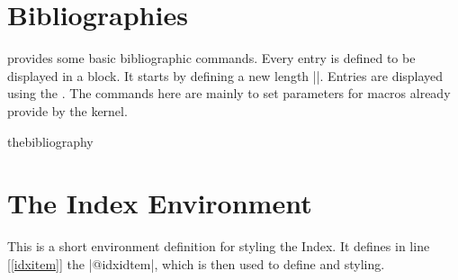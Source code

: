 \section{Bibliographies}


\latex provides some basic bibliographic commands. Every entry is defined to be displayed in a block. It starts by defining a new length |\bibindent|. Entries are displayed using the  . The commands here are mainly to set parameters for macros already provide by the kernel.

\begin{docEnvironment}{thebibliography}{}
\end{docEnvironment}

\begin{teX}
\newdimen\bibindent
\setlength\bibindent{1.5em}
\newenvironment{thebibliography}[1]
     {\chapter*{\bibname}%
      \@mkboth{\MakeUppercase\bibname}{\MakeUppercase\bibname}%
      \list{\@biblabel{\@arabic\c@enumiv}}%
           {\settowidth\labelwidth{\@biblabel{#1}}%
            \leftmargin\labelwidth
            \advance\leftmargin\labelsep
            \@openbib@code
            \usecounter{enumiv}%
            \let\p@enumiv\@empty
            \renewcommand\theenumiv{\@arabic\c@enumiv}}%
      \sloppy
      \clubpenalty4000
      \@clubpenalty \clubpenalty
      \widowpenalty4000%
      \sfcode`\.\@m}
     {\def\@noitemerr
       {\@latex@warning{Empty `thebibliography' environment}}%
      \endlist}
\newcommand\newblock{\hskip .11em\@plus.33em\@minus.07em}
\let\@openbib@code\@empty
\end{teX}

\section{The Index Environment}

This is a short environment definition for styling the Index. It defines in line [\ref{idxitem}] the 
|@idxidtem|, which is then used to define  and  styling.

